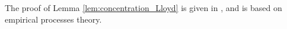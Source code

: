 \documentclass[noinfoline,preprint]{article}
\newtheorem{lem}[theorem]{Lemma}
\newcommand{\cb}{\mathbf{c}}
\renewcommand{\1}{\mathds 1}
\newcommand{\B}{\mathcal{B}}
\begin{document}
The proof of Lemma \ref{lem:concentration_Lloyd} is given in , and is based on empirical processes theory.
%
\end{document}
